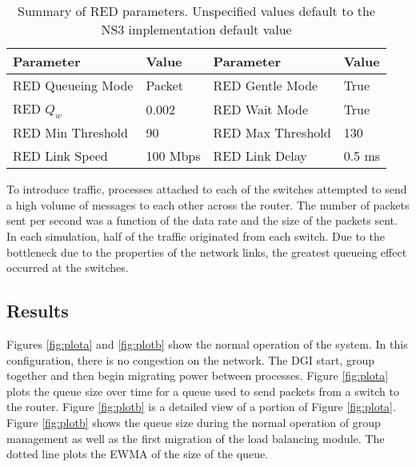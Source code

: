 \begin{table}
\begin{center}
\begin{tabular}{ | l | l || l | l | } \hline
Parameter & Value & Parameter & Value        \\ \hline
RED Queueing Mode & Packet & RED Gentle Mode & True    \\ \hline
RED $Q_{w}$ & 0.002 & RED Wait Mode & True      \\ \hline
RED Min Threshold & 90 & RED Max Threshold & 130   \\ \hline
RED Link Speed & 100 Mbps & RED Link Delay & 0.5 ms   \\ \hline
\end{tabular}
\end{center}
\caption{Summary of \ac{RED} parameters. Unspecified values default to the \ac{NS3} implementation default value}
\label{tab:red-parameters}
\end{table}

To introduce traffic, processes attached to each of the switches attempted to send a high volume of messages to each other across the router.
The number of packets sent per second was a function of the data rate and the size of the packets sent.
In each simulation, half of the traffic originated from each switch.
Due to the bottleneck due to the properties of the network links, the greatest queueing effect occurred at the switches.

\subsection{Results}
\label{sect:results}
Figures \ref{fig:plota} and \ref{fig:plotb} show the normal operation of the system.
In this configuration, there is no congestion on the network. 
The \ac{DGI} start, group together and then begin migrating power between processes.
Figure \ref{fig:plota} plots the queue size over time for a queue used to send packets from a switch to the router.
Figure \ref{fig:plotb} is a detailed view of a portion of Figure \ref{fig:plota}.
Figure \ref{fig:plotb} shows the queue size during the normal operation of group management as well as the first migration of the load balancing module.
The dotted line plots the \ac{EWMA} of the size of the queue.

